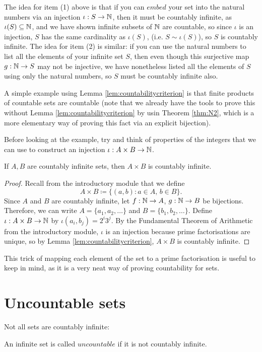 \documentclass[../analysis1.tex]{subfiles}
\begin{document}
The idea for item (1) above is that if you can $embed$ your set into the natural numbers via an injection $\iota:S\to\mathbb{N}$, then it must be countably infinite, as $\iota(S)\subseteq\mathbb{N}$, and we have shown infinite subsets of $\mathbb{N}$ are countable,
so since $\iota$ is an injection, $S$ has the same cardinality as $\iota (S)$, (i.e. $S\sim \iota(S)$), so $S$ is countably infinite. The idea for item (2)
is similar: if you can use the natural numbers to list all the elements of your infinite set $S$, then even though this surjective map $g:\mathbb{N}\to S$ may not be injective, we have nonetheless listed all the elements of $S$ using only the natural numbers,
so $S$ must be countably infinite also.\par
A simple example using Lemma \ref{lem:countabilitycriterion} is that finite products of countable sets are countable (note that we already have the tools to prove this without Lemma \ref{lem:countabilitycriterion} by usin Theorem \ref{thm:N2}, which is a more elementary way of proving this fact via an explicit bijection).\par
Before looking at the example, try and think of properties of the integers that we can use to construct an injection $\iota:A\times B\to \mathbb{N}$.
\begin{example}
    If $A,B$ are countably infinite sets, then $A\times B$ is countably infinite.
\end{example}
\begin{proof}
    Recall from the introductory module that we define $$A\times B\coloneqq \{(a,b):a\in A,\, b\in B\}.$$
    Since $A$ and $B$ are countably infinite, let $f:\mathbb{N}\to A$, $g:\mathbb{N}\to B$ be bijections. Therefore, we can write $A=\{a_1,a_2,\dots\}$ and $B=\{b_1,b_2,\dots\}$.
    Define $\iota: A\times B\to \mathbb{N}$ by $\iota(a_i,b_j)=2^i3^j$. By the Fundamental Theorem of Arithmetic from the introductory module, $\iota$ is an injection because prime factorisations are unique,
    so by Lemma \ref{lem:countabilitycriterion}, $A\times B$ is countably infinite.\qedhere
\end{proof}
This trick of mapping each element of the set to a prime factorisation is useful to keep in mind, as it is a very neat way of proving countability for sets.


\section{Uncountable sets}

Not all sets are countably infinite:
\begin{definition}
    \begin{shaded*}
        An infinite set is called $uncountable$ if it is not countably infinite.
    \end{shaded*}
\end{definition}
\end{document}
